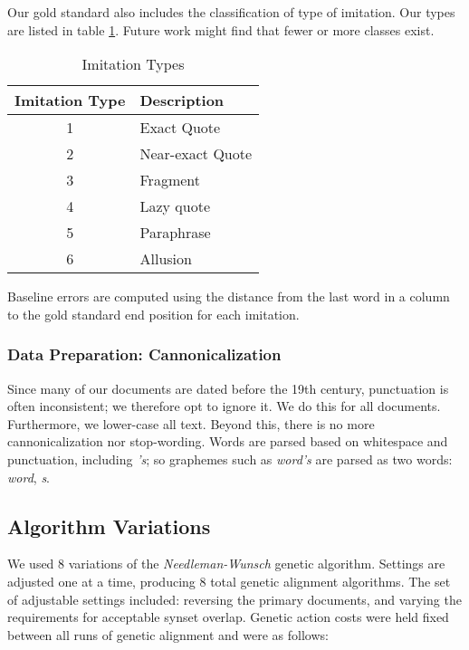 Our gold standard also includes the classification of type of imitation. Our types are listed in table \ref{tab:imitation-types}. Future work might find that fewer or more classes exist.

\begin{table}[center]
	\begin{center}
		\begin{tabular}{|c|l|} \hline
			\textbf{Imitation Type}	& \textbf{Description}		\\ \hline \hline
			1						& Exact Quote				\\ \hline
			2						& Near-exact Quote			\\ \hline
			3						& Fragment					\\ \hline
			4						& Lazy quote				\\ \hline
			5						& Paraphrase				\\ \hline
			6						& Allusion					\\ \hline
		\end{tabular}
	\end{center}
	
	\caption{Imitation Types}
	\label{tab:imitation-types}
\end{table}


Baseline errors are computed using the distance from the last word in a column to the gold standard end position for each imitation.

\subsubsection{Data Preparation: Cannonicalization}
Since many of our documents are dated before the 19th century, punctuation is often inconsistent; we therefore opt to ignore it. We do this for all documents. Furthermore, we lower-case all text. Beyond this, there is no more cannonicalization nor stop-wording. Words are parsed based on whitespace and punctuation, including \textit{'s}; so graphemes such as \textit{word's} are parsed as two words: \textit{word}, \textit{s}. %

\subsection{Algorithm Variations}
We used 8 variations of the \textit{Needleman-Wunsch} genetic algorithm. Settings are adjusted one at a time, producing 8 total genetic alignment algorithms. The set of adjustable settings included: reversing the primary documents, %
and varying the requirements for acceptable synset overlap. Genetic action costs were held fixed between all runs of genetic alignment and were as follows:

